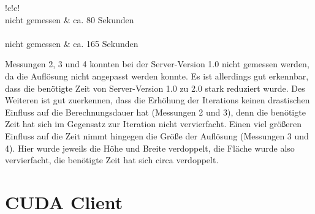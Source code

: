 \documentclass[12pt, onecolumn, notitlepage]{scrartcl}
\begin{document}
\begin{table}[H]
{\begin{tabular}{!{\color{black}\vrule}c!{\color{black}\vrule}c!{\color{black}\vrule}}
			\hline
			    \\ 
			\hline
			nicht
			gemessen     & ca.
			80 Sekunden                                                                                                                                                                            \\ 
			\hline
			        \\ 
			\hline
			nicht
			gemessen     & ca.
			165 Sekunden                                                                                                                                                                           \\
			\hline
		\end{tabular}
	}
	
\end{table}

Messungen 2, 3 und 4 konnten bei der Server-Version 1.0 nicht gemessen werden, da die Auflösung nicht angepasst werden konnte. Es ist allerdings gut erkennbar, dass die benötigte Zeit von Server-Version 1.0 zu 2.0 stark reduziert wurde. Des Weiteren ist gut zuerkennen, dass die Erhöhung der Iterations keinen drastischen Einfluss auf die Berechnungsdauer hat (Messungen 2 und 3), denn die benötigte Zeit hat sich im Gegensatz zur Iteration nicht vervierfacht. Einen viel größeren Einfluss auf die Zeit nimmt hingegen die Größe der Auflösung (Messungen 3 und 4). Hier wurde jeweils die Höhe und Breite verdoppelt, die Fläche wurde also vervierfacht, die benötigte Zeit hat sich circa verdoppelt.


\section{CUDA Client}
\end{document}
